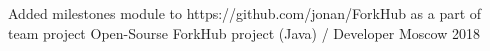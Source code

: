 \begin{cventries}

\cventry
{Added milestones module to https://github.com/jonan/ForkHub as a part of team project} %
{Open-Sourse ForkHub project (Java) / Developer} %
{Moscow} %
{2018} %
{}













\end{cventries}
